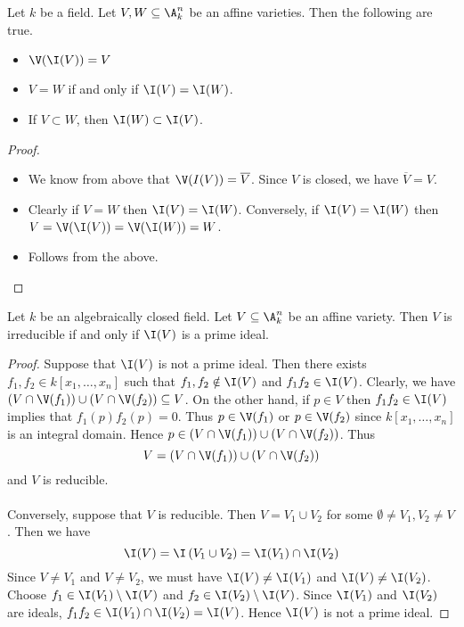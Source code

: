 \documentclass[a4paper]{article}
\begin{document}
\begin{lmm}{}{} Let $k$ be a field. Let $V,W\subseteq\A_k^n$ be an affine varieties. Then the following are true. 
\begin{itemize}
\item $\V(\I(V))=V$
\item $V=W$ if and only if $\I(V)=\I(W)$. 
\item If $V\subset W$, then $\I(W)\subset\I(V)$. 
\end{itemize} 
\begin{proof}~\\
\begin{itemize}
\item We know from above that $\V(I(V))=\overline{V}$. Since $V$ is closed, we have $\overline{V}=V$. 
\item Clearly if $V=W$ then $\I(V)=\I(W)$. Conversely, if $\I(V)=\I(W)$ then $V=\V(\I(V))=\V(\I(W))=W$. 
\item Follows from the above. 
\end{itemize}
\end{proof}
\end{lmm}

\begin{prp}{}{} Let $k$ be an algebraically closed field. Let $V\subseteq\A_k^n$ be an affine variety. Then $V$ is irreducible if and only if $\I(V)$ is a prime ideal. 
\begin{proof}
Suppose that $\I(V)$ is not a prime ideal. Then there exists $f_1,f_2\in k[x_1,\dots,x_n]$ such that $f_1,f_2\notin\I(V)$ and $f_1f_2\in\I(V)$. Clearly, we have $(V\cap\V(f_1))\cup(V\cap\V(f_2))\subseteq V$. On the other hand, if $p\in V$ then $f_1f_2\in\I(V)$ implies that $f_1(p)f_2(p)=0$. Thus $p\in\V(f_1)$ or $p\in\V(f_2)$ since $k[x_1,\dots,x_n]$ is an integral domain. Hence $p\in (V\cap\V(f_1))\cup(V\cap\V(f_2))$. Thus $$V=(V\cap\V(f_1))\cup(V\cap\V(f_2))$$ and $V$ is reducible. \\~\\

Conversely, suppose that $V$ is reducible. Then $V=V_1\cup V_2$ for some $\emptyset\neq V_1,V_2\neq V$. Then we have $$\I(V)=\I\left(V_1\cup V_2\right)=\I(V_1)\cap\I(V_2)$$ Since $V\neq V_1$ and $V\neq V_2$, we must have $\I(V)\neq\I(V_1)$ and $\I(V)\neq\I(V_2)$. Choose $f_1\in\I(V_1)\setminus\I(V)$ and $f_2\in\I(V_2)\setminus\I(V)$. Since $\I(V_1)$ and $\I(V_2)$ are ideals, $f_1f_2\in\I(V_1)\cap\I(V_2)=\I(V)$. Hence $\I(V)$ is not a prime ideal. 
\end{proof}
\end{prp}
\end{document}
